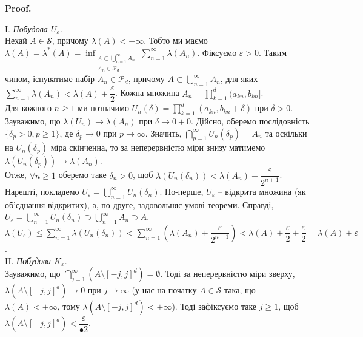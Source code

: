 \documentclass[a4paper, 10pt]{article}
\makeatletter
\theoremstyle{theoremdd}
\renewenvironment{proof}[1][Proof.\\]{\par
\pushQED{\hfill \qed}%
\normalfont \topsep6\p@\@plus6\p@\relax
\trivlist
\item\relax
{\bfseries
#1\@addpunct{.}}\hspace\labelsep\ignorespaces
}{%
\popQED\endtrivlist\@endpefalse
}
\makeatother
\begin{document}
\begin{proof}
I. \textit{Побудова $U_\varepsilon$.}\\
Нехай $A \in \mathcal{S}$, причому $\lambda(A) < +\infty$. Тобто ми маємо $\lambda(A) = \lambda^*(A) = \displaystyle\inf_{\substack{A \subset \bigcup_{n=1}^\infty A_n \\ A_n \in \mathcal{P}_d}} \sum_{n=1}^\infty \lambda(A_n)$. Фіксуємо $\varepsilon > 0$. Таким чином, існуватиме набір $A_n \in \mathcal{P}_d$, причому $A \subset \displaystyle\bigcup_{n=1}^\infty A_n$, для яких $\displaystyle\sum_{n=1}^\infty \lambda(A_n) < \lambda(A) + \dfrac{\varepsilon}{2}$. Кожна множина $A_n = \displaystyle\prod_{k=1}^d (a_{kn},b_{kn}]$.\\
Для кожного $n \geq 1$ ми позначимо $U_n(\delta) = \displaystyle\prod_{k=1}^d (a_{kn},b_{kn}+\delta)$ при $\delta > 0$. Зауважимо, що $\lambda(U_n) \to \lambda(A_n)$ при $\delta \to 0+0$. Дійсно, оберемо послідовність $\{\delta_p > 0, p \geq 1\}$, де $\delta_p \to 0$ при $p \to \infty$. Значить, $\displaystyle\bigcap_{p=1}^\infty U_n(\delta_p) = A_n$ та оскільки на $U_n(\delta_p)$ міра скінченна, то за неперервністю міри знизу матимемо $\lambda(U_n(\delta_p)) \to \lambda(A_n)$.\\
Отже, $\forall n \geq 1$ оберемо таке $\delta_n > 0$, щоб $\lambda(U_n(\delta_n)) < \lambda(A_n) + \dfrac{\varepsilon}{2^{n+1}}$. Нарешті, покладемо $U_\varepsilon = \displaystyle\bigcup_{n=1}^\infty U_n(\delta_n)$. По-перше, $U_\varepsilon$ -- відкрита множина (як об'єднання відкритих), а, по-друге, задовольняє умові теореми. Справді,\\
$U_\varepsilon = \displaystyle\bigcup_{n=1}^\infty U_n(\delta_n) \supset \bigcup_{n=1}^\infty A_n \supset A$.\\
$\lambda(U_\varepsilon) \leq \displaystyle\sum_{n=1}^\infty \lambda(U_n(\delta_n)) < \sum_{n=1}^\infty \left( \lambda(A_n) + \dfrac{\varepsilon}{2^{n+1}}\right) < \lambda(A) + \dfrac{\varepsilon}{2} + \dfrac{\varepsilon}{2} = \lambda(A) + \varepsilon$.
\bigskip \\
II. \textit{Побудова $K_\varepsilon$.}\\
Зауважимо, що $\displaystyle\bigcap_{j=1}^\infty \left(A \setminus [-j,j]^d\right) = \emptyset$. Тоді за неперервністю міри зверху, $\lambda(A \setminus [-j,j]^d) \to 0$ при $j \to \infty$ (у нас на початку $A \in \mathcal{S}$ така, що $\lambda(A) < +\infty$, тому $\lambda(A \setminus [-j,j]^d) < +\infty$). Тоді зафіксуємо таке $j \geq 1$, щоб $\lambda(A \setminus [-j,j]^d) < \dfrac{\varepsilon}{•2}$.\\

\end{proof}
\end{document}
